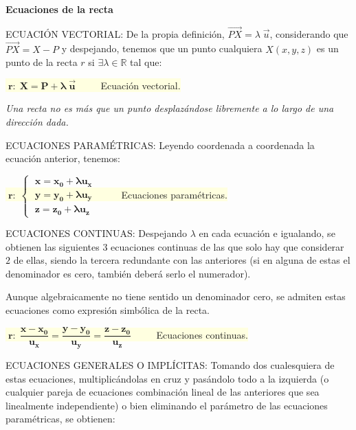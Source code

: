 \justify \textbf{Ecuaciones de la recta}

ECUACIÓN VECTORIAL: De la propia definición, $\overrightarrow {PX}=\lambda \; \vec u$, considerando que $\overrightarrow {PX}=X-P$ y despejando, tenemos que un punto cualquiera $X(x,y,z)$ es un punto de la recta $r$ si $\exists \lambda \in \mathbb R$ tal que:

\vspace{2mm}\colorbox{LightYellow}{$\; \boldsymbol{r:\;  X=P+\lambda \; \vec u }\;\qquad$ Ecuación vectorial.}

\vspace{2mm} \textit{Una recta no es más que un punto desplazándose libremente a lo largo de una dirección dada.}

\vspace{2mm} ECUACIONES PARAMÉTRICAS: Leyendo coordenada a coordenada la ecuación anterior, tenemos:

\vspace{2mm}\colorbox{LightYellow}{$\; \boldsymbol{ r:\;\begin{cases} \; x=x_0+\lambda u_x \\ \; y=y_0+\lambda u_y  \\ \; z=z_0+\lambda u_z  \end{cases} }\;\qquad$ Ecuaciones paramétricas.} 

\vspace{2mm}  ECUACIONES CONTINUAS: Despejando $\lambda$ en cada ecuación e igualando, se obtienen las siguientes $3$ ecuaciones continuas de las que solo hay que considerar $2$ de ellas, siendo la tercera redundante con las anteriores \textcolor{gris}{(si en alguna de estas el denominador es cero, también deberá serlo el numerador)}.
 
\textcolor{gris}{Aunque algebraicamente no tiene sentido un denominador cero, se admiten estas ecuaciones como expresión simbólica de la recta.}

\vspace{2mm}\colorbox{LightYellow}{$\; \boldsymbol{r:\; \dfrac{x-x_0}{u_x}= \dfrac{y-y_0}{u_y}= \dfrac{z-z_0}{u_z} }\;\qquad$ Ecuaciones continuas.}

\vspace{2mm} ECUACIONES GENERALES O IMPLÍCITAS: Tomando dos cualesquiera de estas ecuaciones, multiplicándolas en cruz y pasándolo todo a la izquierda (o cualquier pareja de ecuaciones combinación lineal de las anteriores que sea linealmente independiente) o bien eliminando el parámetro de las ecuaciones paramétricas, se obtienen:


